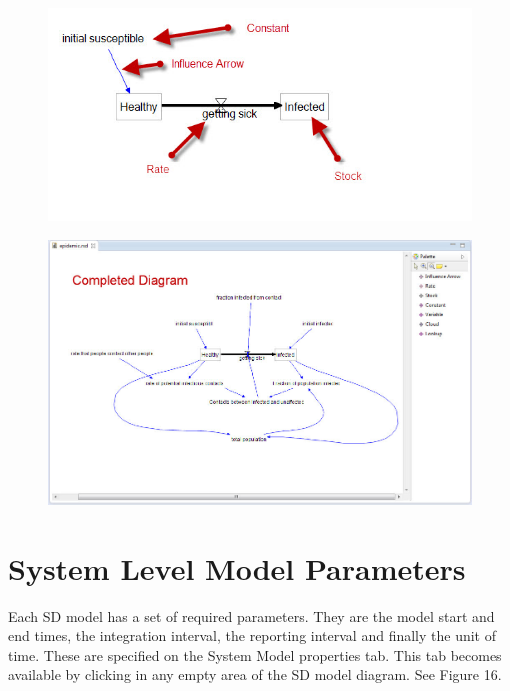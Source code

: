 \documentclass[11pt]{amsart}
\begin{document}
\begin{figure}[ht]
\begin{center}
\vspace{.2in}
\centerline {
\includegraphics[totalheight=0.15\textheight]{images/014.jpg}
}
\caption{}
\label{fig:014}
\end{center}
\end{figure}




\begin{figure}[ht]
\begin{center}
\vspace{.2in}
\centerline {
\includegraphics[totalheight=0.3\textheight]{images/015.jpg}
}
\caption{}
\label{fig:015}
\end{center}
\end{figure}

\clearpage

\section{System Level Model Parameters}
Each SD model has a set of required parameters. They are the model start and end times, the integration interval, the reporting interval and finally the unit of time. These are specified on the System Model properties tab. This tab becomes available by clicking in any empty area of the SD model diagram. See Figure 16.
\end{document}
